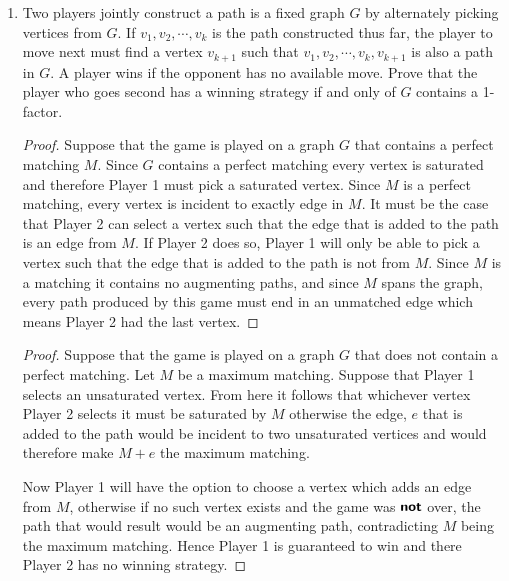 \documentclass[12pt]{article}
\renewcommand{\emph}[1]{\textsf{\textbf{#1}}}
\begin{document}
\begin{enumerate}
\begin{proof}
		Therefore there exists a matching $M_2$, in $G - G'$ which saturates $A \setminus A'$. Note that $M = M_1 \cup M_2$ is a matching for $G$. 

	\end{proof}
	\newpage



	\item Two players jointly construct a path is a fixed graph $G$ by alternately picking vertices from $G$. If $v_1,v_2,\cdots, v_k$ is the path constructed thus far, the player to move next must find a vertex $v_{k+1}$ such that $v_1,v_2,\cdots, v_k, v_{k+1}$ is also a path in $G.$ A player wins if the opponent has no available move. Prove that the player who goes second has a winning strategy if and only of $G$ contains a 1-factor.

	\begin{proof} Suppose that the game is played on a graph $G$ that contains a perfect matching $M$. Since $G$ contains a perfect matching every vertex is saturated and therefore Player 1 must pick a saturated vertex. Since $M$ is a perfect matching, every vertex is incident to exactly edge in $M$. It must be the case that Player 2 can select a vertex such that the edge that is added to the path is an edge from $M$. If Player 2 does so, Player 1 will only be able to pick a vertex such that the edge that is added to the path is not from $M$. Since $M$ is a matching it contains no augmenting paths, and since $M$ spans the graph, every path produced by this game must end in an unmatched edge which means Player 2 had the last vertex.
	\end{proof}
		

   
   
   \begin{proof}
	Suppose that the game is played on a graph $G$ that does not contain a perfect matching. Let $M$ be a maximum matching. Suppose that Player 1 selects an unsaturated vertex. From here it follows that whichever vertex Player 2 selects it must be saturated by $M$ otherwise the edge, $e$ that is added to the path would be incident to two unsaturated vertices and would therefore make $M + e$ the maximum matching. 
	
	Now Player 1 will have the option to choose a vertex which adds an edge from $M$, otherwise if no such vertex exists and the game was $\emph{not}$ over, the path that would result would be an augmenting path, contradicting $M$ being the maximum matching. Hence Player 1 is guaranteed to win and there Player 2 has no winning strategy. 
	\end{proof} 
   






\end{enumerate}
\end{document}
